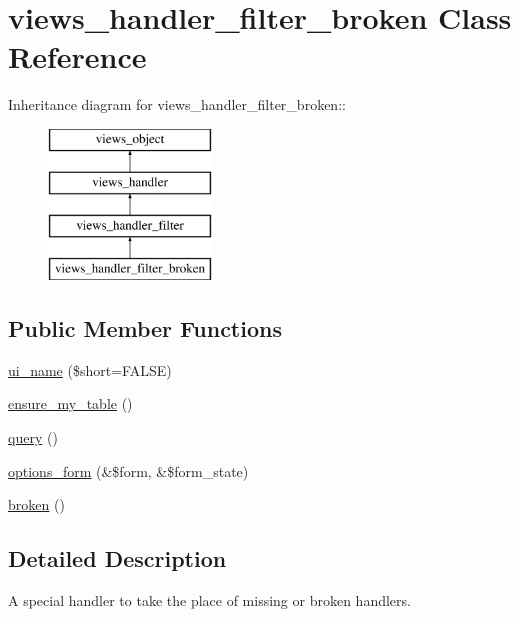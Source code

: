 \hypertarget{classviews__handler__filter__broken}{
\section{views\_\-handler\_\-filter\_\-broken Class Reference}
\label{classviews__handler__filter__broken}
}
Inheritance diagram for views\_\-handler\_\-filter\_\-broken::\begin{figure}[H]
\begin{center}
\leavevmode
\includegraphics[height=4cm]{classviews__handler__filter__broken}
\end{center}
\end{figure}
\subsection*{Public Member Functions}
\begin{CompactItemize}
\item 
\hyperlink{classviews__handler__filter__broken_199df5434e076ecc6889082a83f2e266}{ui\_\-name} (\$short=FALSE)
\item 
\hyperlink{classviews__handler__filter__broken_e85934ec4cf9e01aba2b17ce58ead155}{ensure\_\-my\_\-table} ()
\item 
\hyperlink{classviews__handler__filter__broken_15895a67b79ccabcab4d21945a38477b}{query} ()
\item 
\hyperlink{classviews__handler__filter__broken_51fc714b7aec668a035da8dfb4b4a69a}{options\_\-form} (\&\$form, \&\$form\_\-state)
\item 
\hyperlink{classviews__handler__filter__broken_912a78cd8ee1d5c139613d252f2ca9e1}{broken} ()
\end{CompactItemize}


\subsection{Detailed Description}
A special handler to take the place of missing or broken handlers. 

